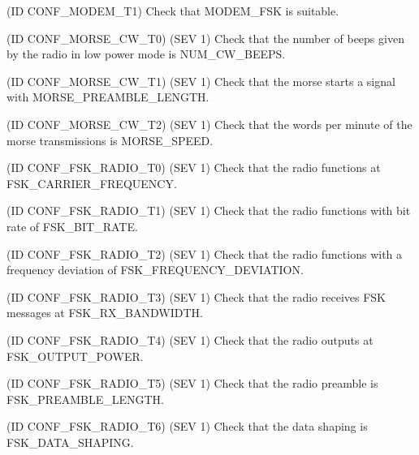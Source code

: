 \begin{DoxyRefList}
(ID C\+O\+N\+F\+\_\+\+M\+O\+D\+E\+M\+\_\+\+T1) Check that M\+O\+D\+E\+M\+\_\+\+F\+SK is suitable. 
\item[\label{test__test000029}%
\Hypertarget{test__test000029}%
Module \hyperlink{group__defines__radio__morse__cw__configuration}{defines\+\_\+radio\+\_\+morse\+\_\+cw\+\_\+configuration} ](ID C\+O\+N\+F\+\_\+\+M\+O\+R\+S\+E\+\_\+\+C\+W\+\_\+\+T0) (S\+EV 1) Check that the number of beeps given by the radio in low power mode is N\+U\+M\+\_\+\+C\+W\+\_\+\+B\+E\+E\+PS. 

(ID C\+O\+N\+F\+\_\+\+M\+O\+R\+S\+E\+\_\+\+C\+W\+\_\+\+T1) (S\+EV 1) Check that the morse starts a signal with M\+O\+R\+S\+E\+\_\+\+P\+R\+E\+A\+M\+B\+L\+E\+\_\+\+L\+E\+N\+G\+TH. 

(ID C\+O\+N\+F\+\_\+\+M\+O\+R\+S\+E\+\_\+\+C\+W\+\_\+\+T2) (S\+EV 1) Check that the words per minute of the morse transmissions is M\+O\+R\+S\+E\+\_\+\+S\+P\+E\+ED. 
\item[\label{test__test000028}%
\Hypertarget{test__test000028}%
Module \hyperlink{group__defines__radio__non__ism__band__fsk__configuraiton}{defines\+\_\+radio\+\_\+non\+\_\+ism\+\_\+band\+\_\+fsk\+\_\+configuraiton} ](ID C\+O\+N\+F\+\_\+\+F\+S\+K\+\_\+\+R\+A\+D\+I\+O\+\_\+\+T0) (S\+EV 1) Check that the radio functions at F\+S\+K\+\_\+\+C\+A\+R\+R\+I\+E\+R\+\_\+\+F\+R\+E\+Q\+U\+E\+N\+CY. 

(ID C\+O\+N\+F\+\_\+\+F\+S\+K\+\_\+\+R\+A\+D\+I\+O\+\_\+\+T1) (S\+EV 1) Check that the radio functions with bit rate of F\+S\+K\+\_\+\+B\+I\+T\+\_\+\+R\+A\+TE. 

(ID C\+O\+N\+F\+\_\+\+F\+S\+K\+\_\+\+R\+A\+D\+I\+O\+\_\+\+T2) (S\+EV 1) Check that the radio functions with a frequency deviation of F\+S\+K\+\_\+\+F\+R\+E\+Q\+U\+E\+N\+C\+Y\+\_\+\+D\+E\+V\+I\+A\+T\+I\+ON. 

(ID C\+O\+N\+F\+\_\+\+F\+S\+K\+\_\+\+R\+A\+D\+I\+O\+\_\+\+T3) (S\+EV 1) Check that the radio receives F\+SK messages at F\+S\+K\+\_\+\+R\+X\+\_\+\+B\+A\+N\+D\+W\+I\+D\+TH. 

(ID C\+O\+N\+F\+\_\+\+F\+S\+K\+\_\+\+R\+A\+D\+I\+O\+\_\+\+T4) (S\+EV 1) Check that the radio outputs at F\+S\+K\+\_\+\+O\+U\+T\+P\+U\+T\+\_\+\+P\+O\+W\+ER. 

(ID C\+O\+N\+F\+\_\+\+F\+S\+K\+\_\+\+R\+A\+D\+I\+O\+\_\+\+T5) (S\+EV 1) Check that the radio preamble is F\+S\+K\+\_\+\+P\+R\+E\+A\+M\+B\+L\+E\+\_\+\+L\+E\+N\+G\+TH. 

(ID C\+O\+N\+F\+\_\+\+F\+S\+K\+\_\+\+R\+A\+D\+I\+O\+\_\+\+T6) (S\+EV 1) Check that the data shaping is F\+S\+K\+\_\+\+D\+A\+T\+A\+\_\+\+S\+H\+A\+P\+I\+NG. 


\end{DoxyRefList}
